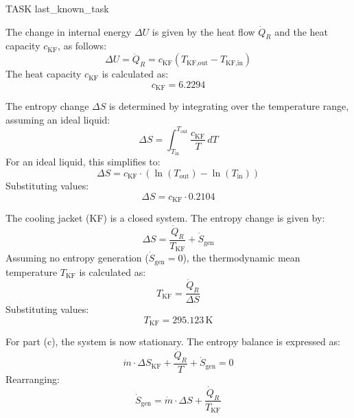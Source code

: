 TASK {last_known_task}

The change in internal energy \( \Delta U \) is given by the heat flow \( \dot{Q}_R \) and the heat capacity \( c_{\text{KF}} \), as follows:
\[
\Delta U = \dot{Q}_R = c_{\text{KF}} \left( T_{\text{KF,out}} - T_{\text{KF,in}} \right)
\]
The heat capacity \( c_{\text{KF}} \) is calculated as:
\[
c_{\text{KF}} = 6.2294
\]

The entropy change \( \Delta S \) is determined by integrating over the temperature range, assuming an ideal liquid:
\[
\Delta S = \int_{T_{\text{in}}}^{T_{\text{out}}} \frac{c_{\text{KF}}}{T} \, dT
\]
For an ideal liquid, this simplifies to:
\[
\Delta S = c_{\text{KF}} \cdot \left( \ln(T_{\text{out}}) - \ln(T_{\text{in}}) \right)
\]
Substituting values:
\[
\Delta S = c_{\text{KF}} \cdot 0.2104
\]

The cooling jacket (KF) is a closed system. The entropy change is given by:
\[
\Delta S = \frac{\dot{Q}_R}{T_{\text{KF}}} + \dot{S}_{\text{gen}}
\]
Assuming no entropy generation (\( \dot{S}_{\text{gen}} = 0 \)), the thermodynamic mean temperature \( T_{\text{KF}} \) is calculated as:
\[
T_{\text{KF}} = \frac{\dot{Q}_R}{\Delta S}
\]
Substituting values:
\[
T_{\text{KF}} = 295.123 \, \text{K}
\]

For part (c), the system is now stationary. The entropy balance is expressed as:
\[
\dot{m} \cdot \Delta S_{\text{KF}} + \frac{\dot{Q}_R}{T} + \dot{S}_{\text{gen}} = 0
\]
Rearranging:
\[
\dot{S}_{\text{gen}} = \dot{m} \cdot \Delta S + \frac{\dot{Q}_R}{T_{\text{KF}}}
\]